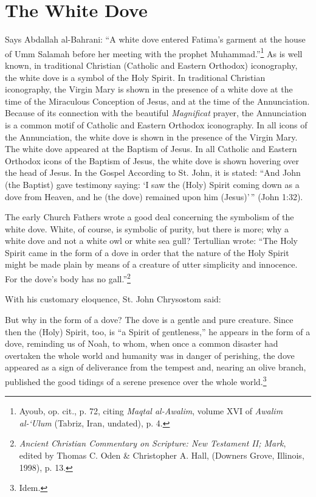 \section{The White Dove}

Says Abdallah al-Bahrani: ``A white dove entered Fatima's garment at the house of Umm Salamah before her meeting with the prophet Muhammad.''\footnote{Ayoub, op. cit., p. 72, citing \emph{Maqtal al-Awalim}, volume XVI of \emph{Awalim al-`Ulum} (Tabriz, Iran, undated), p. 4.} As is well known, in traditional Christian (Catholic and Eastern Orthodox) iconography, the white dove is a symbol of the Holy Spirit. In traditional Christian iconography, the Virgin Mary is shown in the presence of a white dove at the time of the Miraculous Conception of Jesus, and at the time of the Annunciation. Because of its connection with the beautiful \emph{Magnificat} prayer, the Annunciation is a common motif of Catholic and Eastern Orthodox iconography. In all icons of the Annunciation, the white dove is shown in the presence of the Virgin Mary. The white dove appeared at the Baptism of Jesus. In all Catholic and Eastern Orthodox icons of the Baptism of Jesus, the white dove is shown hovering over the head of Jesus. In the Gospel According to St. John, it is stated: ``And John (the Baptist) gave testimony saying: `I saw the (Holy) Spirit coming down as a dove from Heaven, and he (the dove) remained upon him (Jesus)'\,'' (John 1:32).

The early Church Fathers wrote a good deal concerning the symbolism of the white dove. White, of course, is symbolic of purity, but there is more; why a white dove and not a white owl or white sea gull? Tertullian wrote: ``The Holy Spirit came in the form of a dove in order that the nature of the Holy Spirit might be made plain by means of a creature of utter simplicity and innocence. For the dove's body has no gall.''\footnote{\emph{\textit{Ancient Christian Commentary on Scripture:} New Testament II; Mark}, edited by Thomas C. Oden \& Christopher A. Hall, (Downers Grove, Illinois, 1998), p. 13.}

With his customary eloquence, St. John Chrysostom said:

\begin{quotex}
But why in the form of a dove? The dove is a gentle and pure creature. Since then the (Holy) Spirit, too, is ``a Spirit of gentleness,'' he appears in the form of a dove, reminding us of Noah, to whom, when once a common disaster had overtaken the whole world and humanity was in danger of perishing, the dove appeared as a sign of deliverance from the tempest and, nearing an olive branch, published the good tidings of a serene presence over the whole world.\footnote{Idem.}
\end{quotex}


